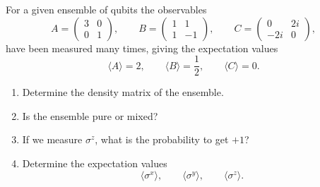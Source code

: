 \begin{Problem}
For a given ensemble of qubits the observables
\[
A=
\begin{pmatrix}
3 & 0\\
0 & 1
\end{pmatrix},
\qquad
B=
\begin{pmatrix}
1 & 1\\
1 & -1
\end{pmatrix},
\qquad
C=
\begin{pmatrix}
0 & 2i\\
-2i & 0
\end{pmatrix},
\]
have been measured many times, giving the expectation values
\[
\langle A\rangle = 2,
\qquad
\langle B\rangle = \frac12,
\qquad
\langle C\rangle = 0.
\]

\begin{enumerate}
\item[(a)] Determine the density matrix of the ensemble.
\item[(b)] Is the ensemble pure or mixed?
\item[(c)] If we measure $\sigma^z$, what is the probability to get $+1$?
\item[(d)] Determine the expectation values
\[
\langle \sigma^x\rangle,\qquad
\langle \sigma^y\rangle,\qquad
\langle \sigma^z\rangle.
\]
\end{enumerate}
\end{Problem}
